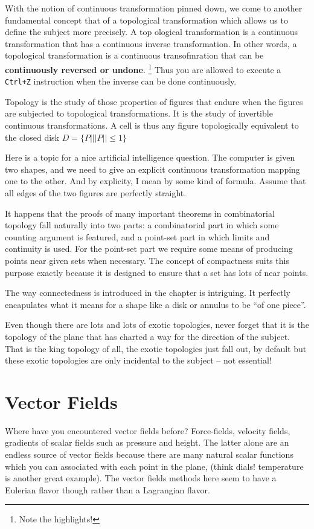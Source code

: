 \newchunk With the notion of continuous transformation pinned down, we come to another fundamental concept that of a topological
transformation which allows us to define the subject more precisely. A top ological transformation is a continuous transformation
that has a continuous inverse transformation. In other words, a topological transformation is a continuous transofmration that can be
\textbf{continuously reversed or undone}. \footnote{Note the highlights!} Thus you are allowed to execute a \texttt{Ctrl+Z} instruction
when the inverse can  be done continuously. 

\newchunk Topology is the study of those properties of figures that endure when the figures are subjected to topological transformations. 
It is the study of invertible continuous transformations. A cell is thus any figure topologically equivalent to the closed disk
$D=\{P | ||P|| \leq 1\}$


\newchunk Here is a topic for a nice artificial intelligence question. The computer is given two shapes, and we need to give
an explicit continuous transformation mapping one to the other. And by explicity, I mean by some kind of formula. Assume that all
edges of the two figures are perfectly straight. 

\newchunk It happens that the proofs of many important theorems in combinatorial topology fall naturally into two parts:
a combinatorial part in which some counting argument is featured, and a point-set part in which limits and continuity is
used. For the point-set part we require some means of producing points near given sets when necessary. The concept of
compactness suits this purpose exactly because it is designed to ensure that a set has lots of near points. 

\newchunk The way connectedness is introduced in the chapter is intriguing. It perfectly encapulates what it means
for a shape like a disk or annulus to be ``of one piece''. 

\newchunk Even though there are lots and lots of exotic topologies, never forget that it is the topology of the plane
that has charted a way for the direction of the subject. That is the king topology of all, the exotic topologies just
fall out, by default but these exotic topologies are only incidental to the subject -- not essential!



\newpage

\chapter{Vector Fields}
\newchunk Where have you encountered vector fields before? Force-fields,
velocity fields, gradients of scalar fields such as pressure and height.
The latter alone are an endless source of vector fields because there are
many natural scalar functions which you can associated with each point in
the plane, (think dials! temperature is another great example). The vector
fields methods here seem to have a Eulerian flavor though rather than a
Lagrangian flavor. 

